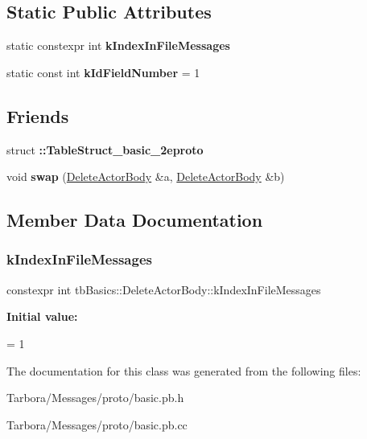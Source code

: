 \subsection*{Static Public Attributes}
\begin{DoxyCompactItemize}
\item 
static constexpr int {\bfseries k\+Index\+In\+File\+Messages}
\item 
\mbox{\label{classtbBasics_1_1DeleteActorBody_abba916f1f94268d9728f7ae559111e0a}} 
static const int {\bfseries k\+Id\+Field\+Number} = 1
\end{DoxyCompactItemize}
\subsection*{Friends}
\begin{DoxyCompactItemize}
\item 
\mbox{\label{classtbBasics_1_1DeleteActorBody_ae86a2f4c520666b65d606ccbe2122e61}} 
struct {\bfseries \+::\+Table\+Struct\+\_\+basic\+\_\+2eproto}
\item 
\mbox{\label{classtbBasics_1_1DeleteActorBody_a7e7b4c032bd6b8ee75e5f56c267a03f0}} 
void {\bfseries swap} (\hyperlink{classtbBasics_1_1DeleteActorBody}{Delete\+Actor\+Body} \&a, \hyperlink{classtbBasics_1_1DeleteActorBody}{Delete\+Actor\+Body} \&b)
\end{DoxyCompactItemize}


\subsection{Member Data Documentation}
\mbox{\label{classtbBasics_1_1DeleteActorBody_a1219361ba785676c175587a3e12842f5}} 
\subsubsection{\texorpdfstring{k\+Index\+In\+File\+Messages}{kIndexInFileMessages}}
{\footnotesize\ttfamily constexpr int tb\+Basics\+::\+Delete\+Actor\+Body\+::k\+Index\+In\+File\+Messages\hspace{0.3cm}{\ttfamily [static]}}

{\bfseries Initial value\+:}
\begin{DoxyCode}
=
    1
\end{DoxyCode}


The documentation for this class was generated from the following files\+:\begin{DoxyCompactItemize}
\item 
Tarbora/\+Messages/proto/basic.\+pb.\+h\item 
Tarbora/\+Messages/proto/basic.\+pb.\+cc\end{DoxyCompactItemize}
